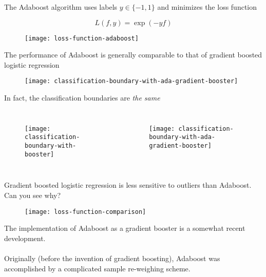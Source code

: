 %
\begin{frame}
The Adaboost algorithm uses labels $y \in \{-1, 1\}$ and minimizes the loss function

$$ L(f, y) = \exp( - y f) $$

  \begin{figure}
    \texttt{[image: loss-function-adaboost]}
  \end{figure}

\end{frame}
%
\begin{frame}
The performance of Adaboost is generally comparable to that of gradient boosted logistic regression

  \begin{figure}
  
    \texttt{[image: classification-boundary-with-ada-gradient-booster]}
  \end{figure}
  
\end{frame}
%
\begin{frame}
In fact, the classification boundaries are \textit{the same}

  \begin{columns}
    \begin{figure}
      \texttt{[image: classification-boundary-with-booster]}
    \end{figure}
    \begin{figure}
      \texttt{[image: classification-boundary-with-ada-gradient-booster]}
    \end{figure}
  \end{columns}
  
\end{frame}
%
\begin{frame}
Gradient boosted logistic regression is less sensitive to outliers than Adaboost.  Can you see why?

  \begin{figure}
    \texttt{[image: loss-function-comparison]}
  \end{figure}
  
\end{frame}
%
\begin{frame}[fragile]
The implementation of Adaboost as a gradient booster is a somewhat recent development.\\~\\

Originally (before the invention of gradient boosting), Adaboost was accomplished by a complicated sample re-weighing scheme.\\~\\
\end{frame}
